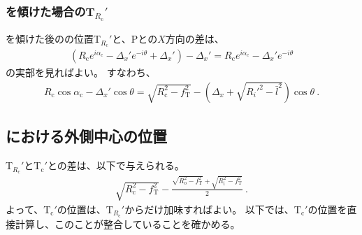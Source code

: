 \subsubsection{\Table を傾けた場合のT\texorpdfstring{$_{R_\mathrm c}'$}{Rc'}}
\Table を傾けた後の\TopCurvatureCenter の位置T$_{R_\mathrm c}'$と、\TableCenter Pとの$X$方向の差は、
\begin{align*}
  \left(R_\mathrm ce^{i\alpha_\mathrm c}-\Delta_x'e^{-i\theta}+\Delta_x'\right)-\Delta_x'
  = R_\mathrm ce^{i\alpha_\mathrm c}-\Delta_x'e^{-i\theta}
\end{align*}
の実部を見ればよい。
すなわち、
\begin{align}
  \label{eq:tableTRc}
  R_\mathrm c\cos\alpha_\mathrm c-\Delta_x'\cos\theta
  = \sqrt{R_\mathrm c^2-f_\mathrm T^2}-\left(\Delta_x+\sqrt{R_i'^2-\bar l^2}\right)\cos\theta~.
\end{align}


\clearpage
\subsection{\TopEndFace における外側中心の位置}
\TopCurvatureCenter T$_{R_\mathrm c}'$と\TopODCenter T$_\mathrm c'$との差は、以下で与えられる。
\begin{align}
  \label{eq:TRc-Tc}
  \sqrt{R_\mathrm c^2-f_\mathrm T^2}
  -\frac{\sqrt{R_\mathrm o^2-f_\mathrm T^2}+\sqrt{R_\mathrm i^2-f_\mathrm T^2}}2\ .
\end{align}
よって、\TopODCenter T$_\mathrm c'$の位置は、\TopCurvatureCenter T$_{R_\mathrm c}'$からだけ加味すればよい。
以下では、\TopODCenter T$_\mathrm c'$の位置を直接計算し、このことが整合していることを確かめる。

